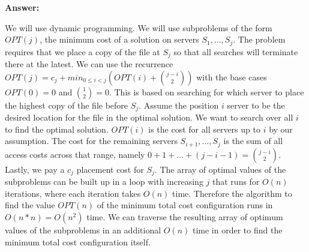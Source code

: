 \documentclass[11pt]{article}
\newcommand\answer{\vspace{.10in}\textbf{Answer: }}
\begin{document}
\answer

We will use dynamic programming. We will use subproblems of the form $OPT(j)$, the minimum cost of a solution on servers $S_1,...,S_j$. The problem requires that we place a copy of the file at $S_j$ so that all searches will terminate there at the latest. We can use the recurrence $OPT(j) = c_j + min_{0 \leq i < j} (OPT(i) + {j - i \choose 2})$ with the base cases $OPT(0) = 0$ and ${1 \choose 2} = 0$. This is based on searching for which server to place the highest copy of the file before $S_j$. Assume the position $i$ server to be the desired location for the file in the optimal solution. We want to search over all $i$ to find the optimal solution. $OPT(i)$ is the cost for all servers up to $i$ by our assumption. The cost for the remaining servers $S_{i + 1},...,S_j$ is the sum of all access costs across that range, namely $0 + 1 + ... + (j - i - 1) = {j - i \choose 2}$. Lastly, we pay a $c_j$ placement cost for $S_j$. The array of optimal values of the subproblems can be built up in a loop with increasing $j$ that runs for $O(n)$ iterations, where each iteration takes $O(n)$ time. Therefore the algorithm to find the value $OPT(n)$ of the minimum total cost configuration runs in $O(n * n) = O(n^2)$ time. We can traverse the resulting array of optimum values of the subproblems in an additional $O(n)$ time in order to find the minimum total cost configuration itself. 

\clearpage
\end{document}
